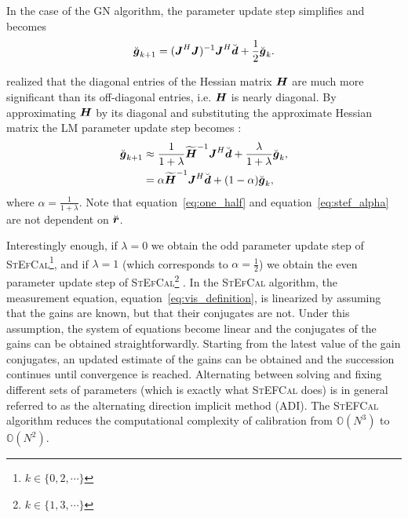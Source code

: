 \documentclass[useAMS,usenatbib]{mn2e}
\newcommand{\br}{\bmath{r}}
\newcommand{\bg}{\bmath{g}}
\newcommand{\bd}{\bmath{d}}
\newcommand{\bJ}{\bmath{J}}
\newcommand{\bH}{\bmath{H}}
\begin{document}
In the case of the GN algorithm, the parameter update step simplifies and becomes \citep{Smirnov2015}
\begin{equation}
\label{eq:one_half}
\breve{\bg}_{k+1} = (\bJ^H\bJ)^{-1}\bJ^H\breve{\bd} + \frac{1}{2}\breve{\bg}_{k}. 
\end{equation}


\citet{Smirnov2015} realized that the diagonal entries of the Hessian matrix $\bH$ are much more significant than its off-diagonal entries, i.e. $\bH$ is nearly diagonal. By approximating $\bH$ by its diagonal and substituting the approximate Hessian matrix the LM parameter update step becomes \citep{Smirnov2015}:
\begin{align}
\breve{\bg}_{k+1} &\approx \frac{1}{1+\lambda}\widetilde{\bH}^{-1}\bJ^H\breve{\bd} + \frac{\lambda}{1+\lambda} \breve{\bg}_k, \nonumber \\
 &= \alpha \widetilde{\bH}^{-1}\bJ^H\breve{\bd} + (1-\alpha)\breve{\bg}_k, 
\label{eq:stef_alpha}  
\end{align}
where $\alpha = \frac{1}{1+\lambda}$. Note that equation~\ref{eq:one_half} and equation~\ref{eq:stef_alpha} are   
not dependent on $\breve{\br}$. 

Interestingly enough, if $\lambda = 0$ we obtain the odd parameter update step of \textsc{StEfCal}\footnote{$k\in\{0,2,\cdots\}$}, and if $\lambda=1$ (which corresponds
to $\alpha=\frac{1}{2}$) we obtain the even parameter update step of \textsc{StEfCal}\footnote{$k\in\{1,3,\cdots\}$} \citep[\textsc{StEfCal},][]{Mitchell:MWA-cal,Salvini2014}. In the \textsc{StEfCal} algorithm, the measurement equation, equation~\ref{eq:vis_definition}, is linearized by assuming that the gains are known, but that their conjugates are not. Under this assumption, the system of equations become linear and the conjugates of the gains can be obtained straightforwardly. Starting from the latest value of the gain conjugates, an updated estimate of the gains can be obtained and the succession continues until convergence is reached.
Alternating between solving and fixing different sets of parameters (which is exactly what \textsc{StEFCal} does) is in general referred to 
as the alternating direction implicit method (ADI). The \textsc{StEFCal} algorithm reduces the computational complexity of calibration from $\mathbb{O}(N^3)$ to $\mathbb{O}(N^2)$.
\end{document}
